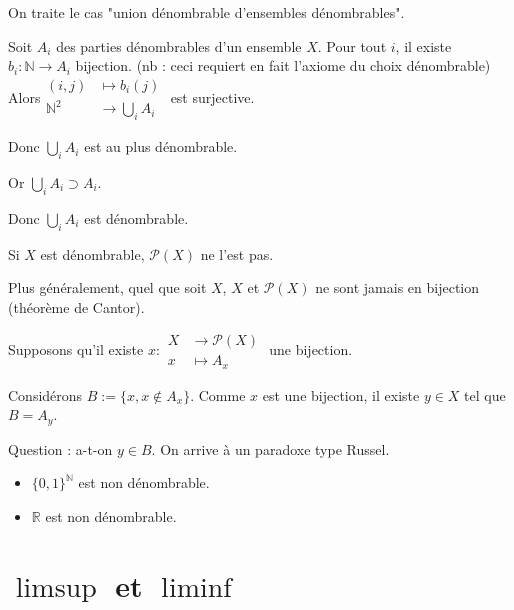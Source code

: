 \documentclass[10pt,a4paper,notitlepage ]{report}
\begin{document}
\begin{demo}
	On traite le cas "union dénombrable d'ensembles dénombrables".
	
	Soit $A_i$ des parties dénombrables d'un ensemble $X$.
	Pour tout $i$, il existe $b_i : \mathbb N \rightarrow A_i$ bijection. (nb : ceci requiert en fait l'axiome du choix dénombrable)
	Alors$ \begin{aligned}
		(i,j) &\mapsto b_i(j) \\
		\mathbb N ^2 & \rightarrow \underset{i}{\bigcup} A_i
	\end{aligned}$ est surjective.

Donc $\underset{i}{\bigcup}A_i$ est au plus dénombrable.

Or $\underset{i}{\bigcup}A_i \supset A_i$.

Donc $\underset{i}{\bigcup} A_i$ est dénombrable.
\end{demo}

\begin{propriete}
	Si $X$ est dénombrable, $\mathcal P(X)$ ne l'est pas.
	
	Plus généralement, quel que soit $X$, $X$ et $\mathcal P(X)$ ne sont jamais en bijection (théorème de Cantor).
\end{propriete}

\begin{demo}
	Supposons qu'il existe $x: \begin{aligned} X & \rightarrow \mathcal P(X) \\
		x & \mapsto A_x \end{aligned}$ une bijection.
	
	Considérons $B := \{x, x\notin A_x\}$. Comme $x$ est une bijection, il existe $y \in X$ tel que $B = A_y$.
	
	Question : a-t-on $y\in B$. On arrive à un paradoxe type Russel.
\end{demo}

\begin{exo}
\begin{itemize}	
	\item $\{0,1\}^\mathbb N$ est non dénombrable.
	
	\item $\mathbb R$ est non dénombrable.
	
\end{itemize}
\end{exo}

\section{$\limsup$ et $\liminf$}
\end{document}
